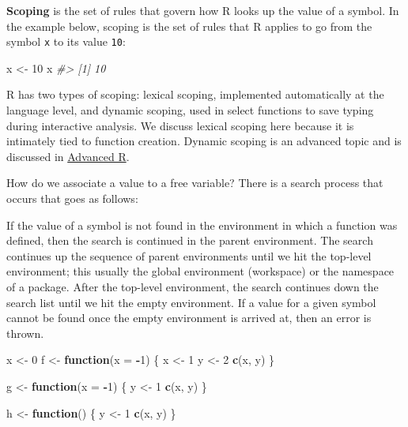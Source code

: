 \documentclass[]{book}
\newenvironment{Shaded}{\begin{snugshade}}{\end{snugshade}}
\newcommand{\KeywordTok}[1]{\textcolor[rgb]{0.13,0.29,0.53}{\textbf{#1}}}
\newcommand{\DataTypeTok}[1]{\textcolor[rgb]{0.13,0.29,0.53}{#1}}
\newcommand{\DecValTok}[1]{\textcolor[rgb]{0.00,0.00,0.81}{#1}}
\newcommand{\StringTok}[1]{\textcolor[rgb]{0.31,0.60,0.02}{#1}}
\newcommand{\CommentTok}[1]{\textcolor[rgb]{0.56,0.35,0.01}{\textit{#1}}}
\newcommand{\ControlFlowTok}[1]{\textcolor[rgb]{0.13,0.29,0.53}{\textbf{#1}}}
\newcommand{\OperatorTok}[1]{\textcolor[rgb]{0.81,0.36,0.00}{\textbf{#1}}}
\newcommand{\NormalTok}[1]{#1}
\theoremstyle{definition}
\theoremstyle{definition}
\theoremstyle{definition}
\theoremstyle{remark}
\begin{document}
\textbf{Scoping} is the set of rules that govern how R looks up the
value of a symbol. In the example below, scoping is the set of rules
that R applies to go from the symbol \texttt{x} to its value
\texttt{10}:

\begin{Shaded}
\begin{Highlighting}[]
\NormalTok{x <-}\StringTok{ }\DecValTok{10}
\NormalTok{x}
\CommentTok{#> [1] 10}
\end{Highlighting}
\end{Shaded}

R has two types of scoping: lexical scoping, implemented automatically
at the language level, and dynamic scoping, used in select functions to
save typing during interactive analysis. We discuss lexical scoping here
because it is intimately tied to function creation. Dynamic scoping is
an advanced topic and is discussed in
\href{http://adv-r.had.co.nz}{Advanced R}.

How do we associate a value to a free variable? There is a search
process that occurs that goes as follows:

If the value of a symbol is not found in the environment in which a
function was defined, then the search is continued in the parent
environment. The search continues up the sequence of parent environments
until we hit the top-level environment; this usually the global
environment (workspace) or the namespace of a package. After the
top-level environment, the search continues down the search list until
we hit the empty environment. If a value for a given symbol cannot be
found once the empty environment is arrived at, then an error is thrown.

\begin{Shaded}
\begin{Highlighting}[]
\NormalTok{x <-}\StringTok{ }\DecValTok{0}
\NormalTok{f <-}\StringTok{ }\ControlFlowTok{function}\NormalTok{(}\DataTypeTok{x =} \OperatorTok{-}\DecValTok{1}\NormalTok{) \{}
\NormalTok{  x <-}\StringTok{ }\DecValTok{1}
\NormalTok{  y <-}\StringTok{ }\DecValTok{2}
  \KeywordTok{c}\NormalTok{(x, y)}
\NormalTok{\}}

\NormalTok{g <-}\StringTok{ }\ControlFlowTok{function}\NormalTok{(}\DataTypeTok{x =} \OperatorTok{-}\DecValTok{1}\NormalTok{) \{}
\NormalTok{  y <-}\StringTok{ }\DecValTok{1}
  \KeywordTok{c}\NormalTok{(x, y)}
\NormalTok{\}}

\NormalTok{h <-}\StringTok{ }\ControlFlowTok{function}\NormalTok{() \{}
\NormalTok{  y <-}\StringTok{ }\DecValTok{1}
  \KeywordTok{c}\NormalTok{(x, y)}
\NormalTok{\}}
\end{Highlighting}
\end{Shaded}
\end{document}
